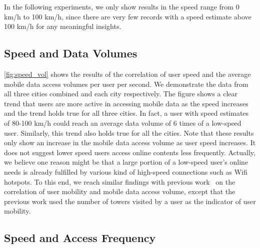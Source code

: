 
In the following experiments, we only show results in the speed range from 0 km/h to 100 km/h, since there are very few records with a speed estimate above 100 km/h for any meaningful insights.

\subsection{Speed and Data Volumes}


\autoref{fig:speed_vol} shows the results of the correlation of user speed and the average mobile data access volumes per user per second. We demonstrate the data from all three cities combined and each city respectively. The figure shows a clear trend that users are more active in accessing mobile data as the speed increases and the trend holds true for all three cities. In fact, a user with speed estimates of 80-100 km/h could reach an average data volume of 6 times of a low-speed user. Similarly, this trend also holds true for all the cities. Note that these results only show an increase in the mobile data access volume as user speed increases. It does not suggest lower speed users access online contents less frequently. Actually, we believe one reason might be that a large portion of a low-speed user's online needs is already fulfilled by various kind of high-speed connections such as Wifi hotspots. To this end, we reach similar findings with previous work~\cite{yang2015characterizing} on the correlation of user mobility and mobile data access volume, except that the previous work used the number of towers visited by a user as the indicator of user mobility.

\subsection{Speed and Access Frequency}

